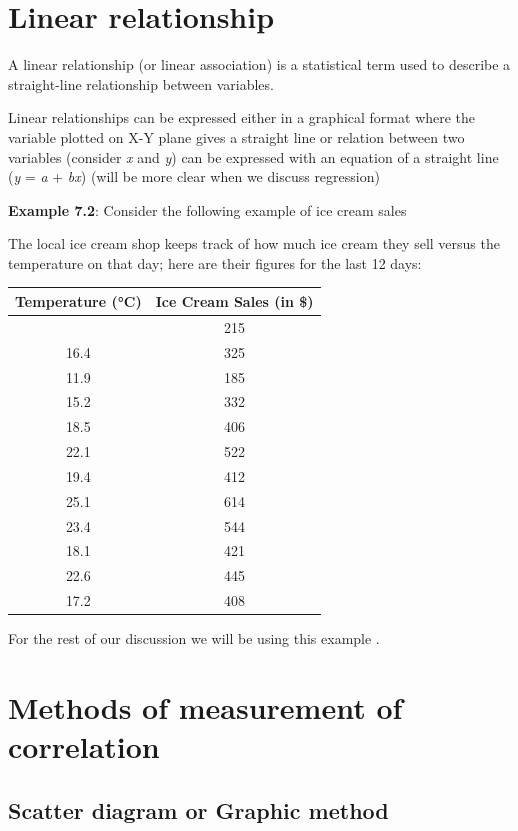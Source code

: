 \documentclass[
]{book}
\begin{document}
\section{Linear relationship}\label{linear-relationship}

A linear relationship (or linear association) is a statistical term used
to describe a straight-line relationship between variables.

Linear relationships can be expressed either in a graphical format where
the variable plotted on X-Y plane gives a straight line or relation
between two variables (consider \emph{x} and \emph{y}) can be expressed with an
equation of a straight line (\emph{y} = \emph{a} + \emph{bx}) (will be more clear when
we discuss regression)

\textbf{Example 7.2}: Consider the following example of ice cream sales

The local ice cream shop keeps track of how much ice cream they sell
versus the temperature on that day; here are their figures for the last
12 days:

\begin{longtable}[]{@{}cc@{}}
\toprule\noalign{}
Temperature (°C) & Ice Cream Sales (in \$) \\
\midrule\noalign{}
\endhead
\bottomrule\noalign{}
\endlastfoot
14.2 & 215 \\
16.4 & 325 \\
11.9 & 185 \\
15.2 & 332 \\
18.5 & 406 \\
22.1 & 522 \\
19.4 & 412 \\
25.1 & 614 \\
23.4 & 544 \\
18.1 & 421 \\
22.6 & 445 \\
17.2 & 408 \\
\end{longtable}

For the rest of our discussion we will be using this example .

\section{Methods of measurement of correlation}\label{methods-of-measurement-of-correlation}

\subsection{Scatter diagram or Graphic method}\label{scatter-diagram-or-graphic-method}
\end{document}
